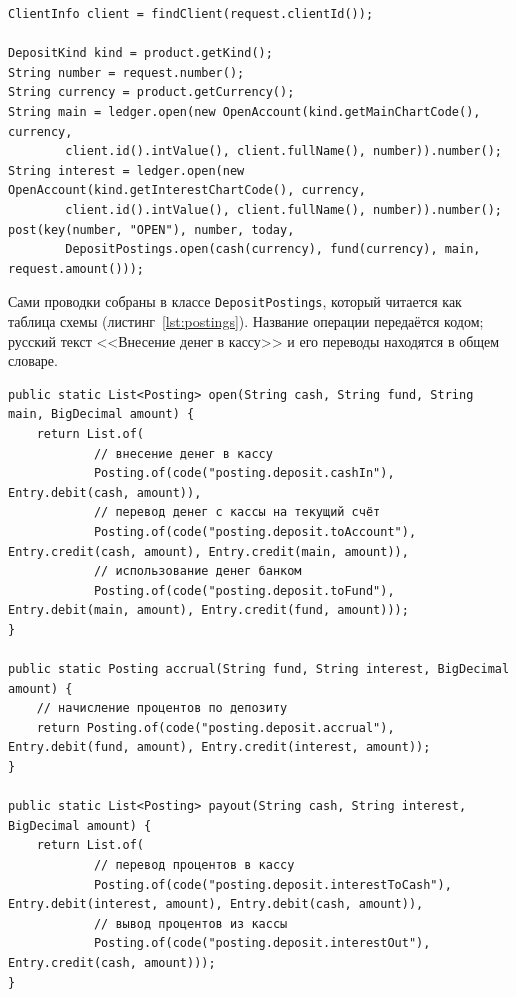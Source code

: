 \documentclass[14pt,a4paper]{extarticle}
\begin{document}
\begin{lstlisting}[style=java, caption={Открытие счетов и проводки приёма вклада (\texttt{DepositService.open})}, label={lst:open}]
ClientInfo client = findClient(request.clientId());

DepositKind kind = product.getKind();
String number = request.number();
String currency = product.getCurrency();
String main = ledger.open(new OpenAccount(kind.getMainChartCode(), currency,
        client.id().intValue(), client.fullName(), number)).number();
String interest = ledger.open(new OpenAccount(kind.getInterestChartCode(), currency,
        client.id().intValue(), client.fullName(), number)).number();
post(key(number, "OPEN"), number, today,
        DepositPostings.open(cash(currency), fund(currency), main, request.amount()));
\end{lstlisting}

Сами проводки собраны в классе \texttt{DepositPostings}, который читается как таблица
схемы (листинг~\ref{lst:postings}). Название операции передаётся кодом; русский текст
<<Внесение денег в кассу>> и его переводы находятся в общем словаре.

\begin{lstlisting}[style=java, caption={Проводки приёма вклада и выплаты процентов (\texttt{DepositPostings})}, label={lst:postings}]
public static List<Posting> open(String cash, String fund, String main, BigDecimal amount) {
    return List.of(
            // внесение денег в кассу
            Posting.of(code("posting.deposit.cashIn"), Entry.debit(cash, amount)),
            // перевод денег с кассы на текущий счёт
            Posting.of(code("posting.deposit.toAccount"), Entry.credit(cash, amount), Entry.credit(main, amount)),
            // использование денег банком
            Posting.of(code("posting.deposit.toFund"), Entry.debit(main, amount), Entry.credit(fund, amount)));
}

public static Posting accrual(String fund, String interest, BigDecimal amount) {
    // начисление процентов по депозиту
    return Posting.of(code("posting.deposit.accrual"), Entry.debit(fund, amount), Entry.credit(interest, amount));
}

public static List<Posting> payout(String cash, String interest, BigDecimal amount) {
    return List.of(
            // перевод процентов в кассу
            Posting.of(code("posting.deposit.interestToCash"), Entry.debit(interest, amount), Entry.debit(cash, amount)),
            // вывод процентов из кассы
            Posting.of(code("posting.deposit.interestOut"), Entry.credit(cash, amount)));
}
\end{lstlisting}
\end{document}
